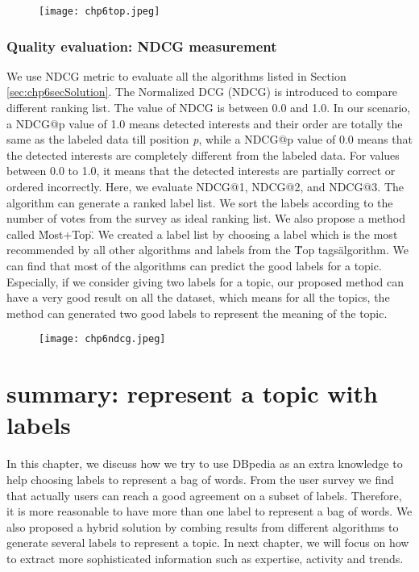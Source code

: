 \begin{figure}[htp]
\centering
\texttt{[image: chp6top.jpeg]}  
\caption{}
\label{fig:chp6top} 
\end{figure}


\subsubsection{Quality evaluation: NDCG measurement}
We use NDCG metric to evaluate all the algorithms listed in Section \ref{sec:chp6secSolution}. The Normalized DCG (NDCG) is introduced to compare different ranking list. The value of NDCG is between 0.0 and 1.0. In our scenario, a NDCG@p value of 1.0 means detected interests and their order are totally the same as the labeled data till position \textit{p}, while a NDCG@p value of 0.0 means that the detected interests are completely different from the labeled data. For values between 0.0 to 1.0, it means that the detected interests are partially correct or ordered incorrectly. %
Here, we evaluate NDCG@1, NDCG@2, and NDCG@3. The algorithm can generate a ranked label list. We sort the labels according to the number of votes from the survey as ideal ranking list. We also propose a method called \"Most+Top\". We created a label list by choosing a label which is the most recommended by all other algorithms and labels from the \"Top tags\" algorithm. We can find that most of the algorithms can predict the good labels for a topic. Especially, if we consider giving two labels for a topic, our proposed method can have a very good result on all the dataset, which means for all the topics, the method can generated two good labels to represent the meaning of the topic.

\begin{figure}[htp]
\centering
\texttt{[image: chp6ndcg.jpeg]}  
\caption{}
\label{fig:chp6ndcg} 
\end{figure}




\section{summary: represent a topic with labels}
In this chapter, we discuss how we try to use DBpedia as an extra knowledge to help choosing labels to represent a bag of words. From the user survey we find that actually users can reach a good agreement on a subset of labels. Therefore, it is more reasonable to have more than one label to represent a bag of words. We also proposed a hybrid solution by combing results from different algorithms to generate several labels to represent a topic. In next chapter, we will focus on how to extract more sophisticated information such as expertise, activity and trends.
